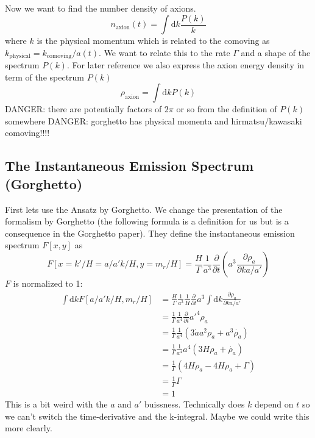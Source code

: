 \documentclass[a4paper]{article}
\begin{document}
Now we want to find the number density of axions.
\begin{equation}
	\label{eq:number_density_from_spectrum}
	n_\mathrm{axion}(t) = \int \mathrm{d} k \frac{P(k)}{k} 
\end{equation}
where $k$ is the physical momentum which is related to the comoving as $k_\mathrm{physical} = k_\mathrm{comoving} / a(t)$.
We want to relate this to the rate $\Gamma$ and a shape of the spectrum $P(k)$.
For later reference we also express the axion energy density in term of the spectrum $P(k)$
\begin{equation}
	\rho_\mathrm{axion}  = \int \mathrm{d} k P(k)
\end{equation}
DANGER: there are potentially factors of $2\pi$ or so from the definition of $P(k)$ somewhere 
DANGER: gorghetto has physical momenta and hirmatsu/kawasaki comoving!!!!

\subsection{The Instantaneous Emission Spectrum (Gorghetto)}
First lets use the Ansatz by Gorghetto. 
We change the presentation of the formalism by Gorghetto (the following formula is a definition for us but is a consequence in the Gorghetto paper).
They define the instantaneous emission spectrum $F[x,y]$ as
\begin{equation}
	\label{eq:F_def}
	F[x = k' / H = a/a' k / H, y = m_r / H] = \frac{H}{\Gamma} \frac{1}{a^3} \frac{\partial}{\partial t} \left( a^3 \frac{\partial \rho_a}{\partial k a / a'} \right)
\end{equation}
$F$ is normalized to 1:
\begin{align}
	\int \mathrm{d} k F[a/a'k/H, m_r/H] &= \frac{H}{\Gamma} \frac{1}{a^3} \frac{1}{H} \frac{\partial}{\partial t} a^3 \int \mathrm{d} k \frac{\partial \rho_a}{\partial k a / a'} \\
	&= \frac{1}{\Gamma} \frac{1}{a^4} \frac{\partial}{\partial t} a'^4 \rho_a \\
	&= \frac{1}{\Gamma} \frac{1}{a^4} (3 \dot{a} a^2 \rho_a + a^3 \dot{\rho_a}) \\
	&= \frac{1}{\Gamma} \frac{1}{a^4} a^4 (3 H \rho_a + \dot{\rho_a}) \\
	&= \frac{1}{\Gamma} (4 H \rho_a - 4 H \rho_a + \Gamma) \\
	&= \frac{1}{\Gamma} \Gamma \\
	&= 1
\end{align}
This is a bit weird with the $a$ and $a'$ buissness.
Technically does $k$ depend on $t$ so we can't switch the time-derivative and the k-integral.
Maybe we could write this more clearly.
\end{document}
